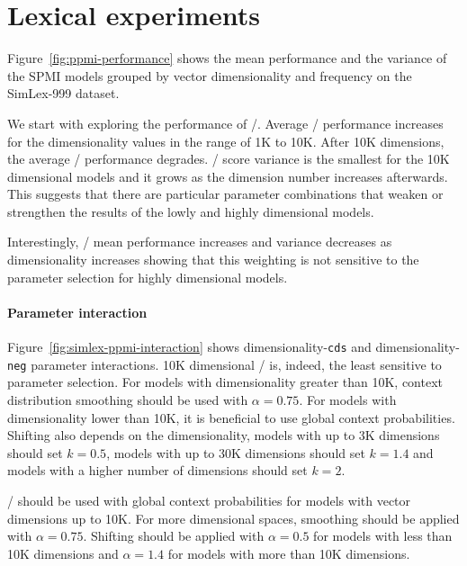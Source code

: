 \documentclass[11pt,letterpaper]{article}
\begin{document}
\section{Lexical experiments}
\label{sec:lexical-experiments}

Figure~\ref{fig:ppmi-performance} shows the mean performance and the variance of the SPMI models grouped by vector dimensionality and frequency on the SimLex-999 dataset.

We start with exploring the performance of \SPMI/. Average \SPMI/ performance increases for the dimensionality values in the range of 1K to 10K. After 10K dimensions, the average \SPMI/ performance degrades. \SPMI/ score variance is the smallest for the 10K dimensional models and it grows as the dimension number increases afterwards. This suggests that there are particular parameter combinations that weaken or strengthen the results of the lowly and highly dimensional models.

Interestingly, \logNSPMI/ mean performance increases and variance decreases as dimensionality increases showing that this weighting is not sensitive to the parameter selection for highly dimensional models.

\paragraph{Parameter interaction}



Figure~\ref{fig:simlex-ppmi-interaction} shows dimensionality-\texttt{cds} and dimensionality-\texttt{neg} parameter interactions. 10K dimensional \SPMI/ is, indeed, the least sensitive to parameter selection. For models with dimensionality greater than 10K, context distribution smoothing should be used with $\alpha = 0.75$. For models with dimensionality lower than 10K, it is beneficial to use global context probabilities. Shifting also depends on the dimensionality, models with up to 3K dimensions should set $k = 0.5$, models with up to 30K dimensions should set $k = 1.4$ and models with a higher number of dimensions should set $k = 2$.

\logNSPMI/ should be used with global context probabilities for models with vector dimensions up to 10K. For more dimensional spaces, smoothing should be applied with $\alpha = 0.75$. Shifting should be applied with $\alpha = 0.5$ for models with less than 10K dimensions and $\alpha = 1.4$ for models with more than 10K dimensions.
\end{document}
